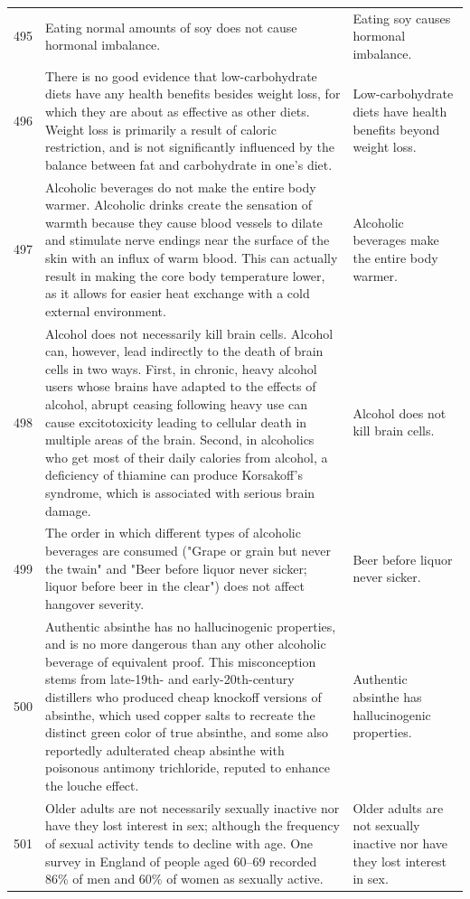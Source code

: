 \begin{tabular}{c|p{}|p{}}
495 & Eating normal amounts of soy does not cause hormonal imbalance. & Eating soy causes hormonal imbalance. \\
496 & There is no good evidence that low-carbohydrate diets have any health benefits besides weight loss, for which they are about as effective as other diets. Weight loss is primarily a result of caloric restriction, and is not significantly influenced by the balance between fat and carbohydrate in one's diet. & Low-carbohydrate diets have health benefits beyond weight loss. \\
497 & Alcoholic beverages do not make the entire body warmer. Alcoholic drinks create the sensation of warmth because they cause blood vessels to dilate and stimulate nerve endings near the surface of the skin with an influx of warm blood. This can actually result in making the core body temperature lower, as it allows for easier heat exchange with a cold external environment. & Alcoholic beverages make the entire body warmer. \\
498 & Alcohol does not necessarily kill brain cells. Alcohol can, however, lead indirectly to the death of brain cells in two ways. First, in chronic, heavy alcohol users whose brains have adapted to the effects of alcohol, abrupt ceasing following heavy use can cause excitotoxicity leading to cellular death in multiple areas of the brain. Second, in alcoholics who get most of their daily calories from alcohol, a deficiency of thiamine can produce Korsakoff's syndrome, which is associated with serious brain damage. & Alcohol does not kill brain cells. \\
499 & The order in which different types of alcoholic beverages are consumed ("Grape or grain but never the twain" and "Beer before liquor never sicker; liquor before beer in the clear") does not affect hangover severity. & Beer before liquor never sicker. \\
500 & Authentic absinthe has no hallucinogenic properties, and is no more dangerous than any other alcoholic beverage of equivalent proof. This misconception stems from late-19th- and early-20th-century distillers who produced cheap knockoff versions of absinthe, which used copper salts to recreate the distinct green color of true absinthe, and some also reportedly adulterated cheap absinthe with poisonous antimony trichloride, reputed to enhance the louche effect. & Authentic absinthe has hallucinogenic properties. \\
501 & Older adults are not necessarily sexually inactive nor have they lost interest in sex; although the frequency of sexual activity tends to decline with age. One survey in England of people aged 60–69 recorded 86\% of men and 60\% of women as sexually active. & Older adults are not sexually inactive nor have they lost interest in sex. \\

\end{tabular}
